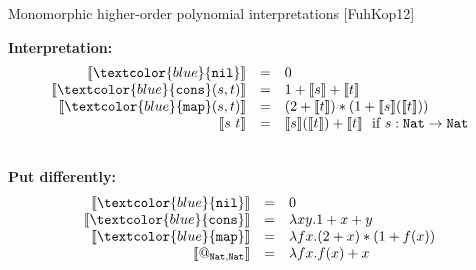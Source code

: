 \documentclass[10pt,presentation,color=names]{beamer}
\newcommand{\arrtype}{\rightarrow}
\newcommand{\interpret}[1]{\llbracket #1 \rrbracket}
\newcommand{\symb}[1]{\textcolor{blue}{\mathtt{#1}}}
\newcommand{\Nat}{\mathtt{Nat}}
\newcommand{\nil}{\symb{nil}}
\newcommand{\cons}{\symb{cons}}
\newcommand{\map}{\symb{map}}
\begin{document}
\begin{frame}{Monomorphic higher-order polynomial interpretations [FuhKop12]}

\textbf{Interpretation:}
\[
\begin{array}{rcl}
\interpret{\nil} & = & 0 \\
\interpret{\cons(s,t)} & = & 1 + \interpret{s} + \interpret{t} \\
\interpret{\map(s,t)} & = & (2 + \interpret{t}) * (1 + \interpret{s}(\interpret{t})) \\
\interpret{s\ t} & = & \interpret{s}(\interpret{t}) + \interpret{t}\ \ \text{if}\ s : \Nat \arrtype \Nat \\
\end{array}
\]

\pause\ \\\textbf{Put differently:}
\[
\begin{array}{rcl}
\interpret{\nil} & = & 0 \\
\interpret{\cons} & = & \lambda x y.1 + x + y \\
\interpret{\map} & = & \lambda f x.(2 + x) * (1 + f(x)) \\
\interpret{@_{\Nat,\Nat}} & = & \lambda f x.f(x) + x \\
\end{array}
\]

\end{frame}
\end{document}
